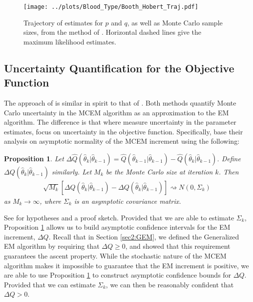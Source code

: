 \documentclass[11pt, oneside]{article}   	%
\newtheorem{proposition}{Proposition}[section]
\begin{document}
\begin{figure}
    \centering
    \caption{Trajectory of estimates for $p$ and $q$, as well as Monte Carlo sample sizes, from the method of \citeauthor{Boo99}. Horizontal dashed lines give the maximum likelihood estimates.}
    \label{fig:blood_BH_traj}
    \texttt{[image: ../plots/Blood\_Type/Booth\_Hobert\_Traj.pdf]}   
\end{figure}






\subsection{Uncertainty Quantification for the Objective Function \citep{Caf05}}
\label{sec2:AMCEM}

The approach of \citet{Caf05} is similar in spirit to that of \citet{Boo99}. Both methods quantify Monte Carlo uncertainty in the MCEM algorithm as an approximation to the EM algorithm. The difference is that where \citeauthor{Boo99} measure uncertainty in the parameter estimates, \citeauthor{Caf05} focus on uncertainty in the objective function. Specifically, \citeauthor{Caf05} base their analysis on asymptotic normality of the MCEM increment using the following:
%
\begin{proposition}
    \label{thm2:Caf_normality}
    Let $\Delta \hat{Q}(\hat{\theta}_k|\hat{\theta}_{k-1}) = \hat{Q}(\hat{\theta}_{k-1}|\hat{\theta}_{k-1}) - \hat{Q}(\hat{\theta}_k|\hat{\theta}_{k-1})$. Define $\Delta Q(\hat{\theta}_k|\hat{\theta}_{k-1})$ similarly. Let $M_k$ be the Monte Carlo size at iteration $k$. Then
    \begin{align}
        \sqrt{M_k} \left[ \Delta \hat{Q}(\hat{\theta}_k|\hat{\theta}_{k-1}) - \Delta Q(\hat{\theta}_k|\hat{\theta}_{k-1}) \right] \rightsquigarrow N(0, \Sigma_k)
    \end{align}
    as $M_k \rightarrow \infty$, where $\Sigma_k$ is an asymptotic covariance matrix.
\end{proposition}

See \citeauthor{Caf05} for hypotheses and a proof sketch. Provided that we are able to estimate $\Sigma_k$, Proposition \ref{thm2:Caf_normality} allows us to build asymptotic confidence intervals for the EM increment, $\Delta Q$. Recall that in Section \ref{sec2:GEM}, we defined the Generalized EM algorithm by requiring that $\Delta Q \geq 0$, and showed that this requirement guarantees the ascent property. While the stochastic nature of the MCEM algorithm makes it impossible to guarantee that the EM increment is positive, we are able to use Proposition \ref{thm2:Caf_normality} to construct asymptotic confidence bounds for $\Delta Q$. Provided that we can estimate $\Sigma_k$, we can then be reasonably confident that $\Delta Q > 0$.
\end{document}
